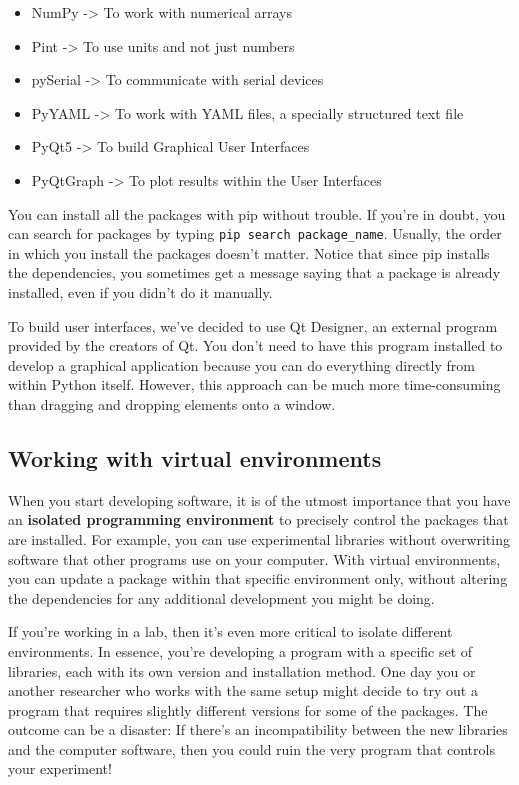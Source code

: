\begin{itemize}
 \item NumPy -> To work with numerical arrays
 \item Pint -> To use units and not just numbers
 \item pySerial -> To communicate with serial devices
 \item PyYAML -> To work with YAML files, a specially structured text file
 \item PyQt5 -> To build Graphical User Interfaces
 \item PyQtGraph -> To plot results within the User Interfaces
\end{itemize}

\sloppy You can install all the packages with pip without trouble. If you're in doubt, you can search for packages by typing \texttt{pip search package_name}. Usually, the order in which you install the packages doesn't matter. Notice that since pip installs the dependencies, you sometimes get a message saying that a package is already installed, even if you didn't do it manually.

To build user interfaces, we've decided to use Qt Designer, an external program provided by the creators of Qt. You don't need to have this program installed to develop a graphical application because you can do everything directly from within Python itself. However, this approach can be much more time-consuming than dragging and dropping elements onto a window.

\subsection{Working with virtual environments}\label{subsec:virtual-environment2}
When you start developing software, it is of the utmost importance that you have an \textbf{isolated programming environment} to precisely control the packages that are installed. For example, you can use experimental libraries without overwriting software that other programs use on your computer. With virtual environments, you can update a package within that specific environment only, without altering the dependencies for any additional development you might be doing.

If you're working in a lab, then it's even more critical to isolate different environments. In essence, you're developing a program with a specific set of libraries, each with its own version and installation method. One day you or another researcher who works with the same setup might decide to try out a program that requires slightly different versions for some of the packages. The outcome can be a disaster: If there's an incompatibility between the new libraries and the computer software, then you could ruin the very program that controls your experiment!

